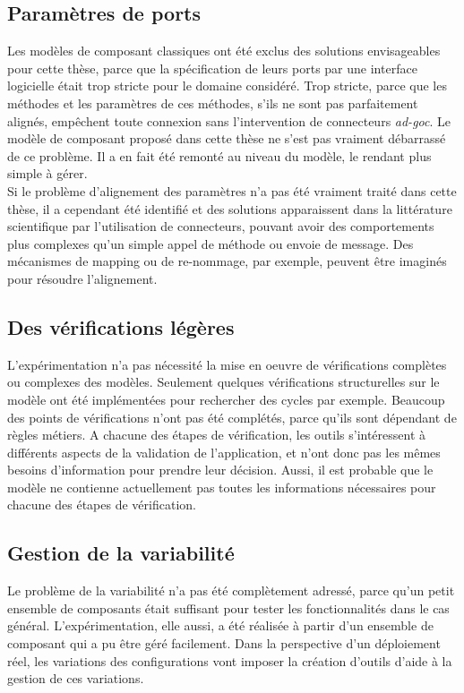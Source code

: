 \subsection{Paramètres de ports}
Les modèles de composant classiques ont été exclus des solutions envisageables pour cette thèse, parce que la spécification de leurs ports par une interface logicielle était trop stricte pour le domaine considéré. Trop stricte, parce que les méthodes et les paramètres de ces méthodes, s'ils ne sont pas parfaitement alignés, empêchent toute connexion sans l'intervention de connecteurs {\it ad-goc}. Le modèle de composant proposé dans cette thèse ne s'est pas vraiment débarrassé de ce problème. Il a en fait été remonté au niveau du modèle, le rendant plus simple à gérer.\\
Si le problème d'alignement des paramètres n'a pas été vraiment traité dans cette thèse, il a cependant été identifié et des solutions apparaissent dans la littérature scientifique par l'utilisation de connecteurs, pouvant avoir des comportements plus complexes qu'un simple appel de méthode ou envoie de message. Des mécanismes de mapping ou de re-nommage, par exemple, peuvent être imaginés pour résoudre l'alignement.



\subsection{Des vérifications légères}
L'expérimentation n'a pas nécessité la mise en oeuvre de vérifications complètes ou complexes des modèles. Seulement quelques vérifications structurelles sur le modèle ont été implémentées pour rechercher des cycles par exemple. Beaucoup des points de vérifications n'ont pas été complétés, parce qu'ils sont dépendant de règles métiers. A chacune des étapes de vérification, les outils s'intéressent à différents aspects de la validation de l'application, et n'ont donc pas les mêmes besoins d'information pour prendre leur décision. Aussi, il est probable que le modèle ne contienne actuellement pas toutes les informations nécessaires pour chacune des étapes de vérification.


\subsection{Gestion de la variabilité}
Le problème de la variabilité n'a pas été complètement adressé, parce qu'un petit ensemble de composants était suffisant pour tester les fonctionnalités dans le cas général. L'expérimentation, elle aussi, a été réalisée à partir d'un ensemble de composant qui a pu être géré facilement. Dans la perspective d'un déploiement réel, les variations des configurations vont imposer la création d'outils d'aide à la gestion de ces variations.

